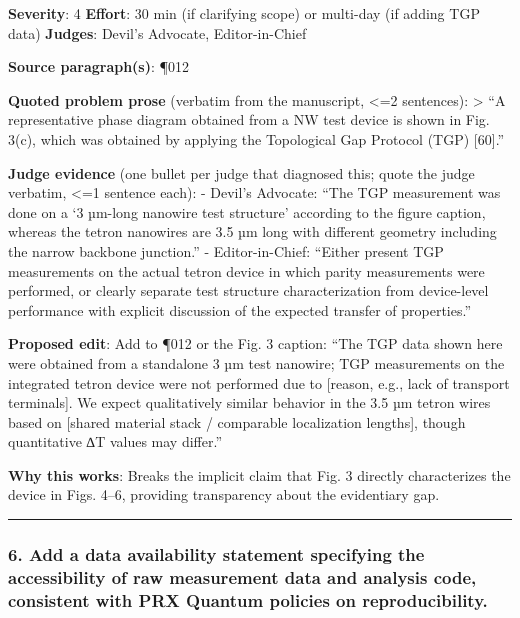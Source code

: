 \documentclass[10pt,letterpaper]{article}
\begin{document}
\textbf{Severity}: 4 \textbf{Effort}: 30 min (if clarifying scope) or multi-day (if adding TGP data) \textbf{Judges}: Devil's Advocate, Editor-in-Chief

\textbf{Source paragraph(s)}: ¶012

\textbf{Quoted problem prose} (verbatim from the manuscript, \textless=2 sentences):
\textgreater{} ``A representative phase diagram obtained from a NW test device is shown in Fig. 3(c), which was obtained by applying the Topological Gap Protocol (TGP) {[}60{]}.''

\textbf{Judge evidence} (one bullet per judge that diagnosed this; quote the judge verbatim, \textless=1 sentence each):
- Devil's Advocate: ``The TGP measurement was done on a `3 µm-long nanowire test structure' according to the figure caption, whereas the tetron nanowires are 3.5 µm long with different geometry including the narrow backbone junction.''
- Editor-in-Chief: ``Either present TGP measurements on the actual tetron device in which parity measurements were performed, or clearly separate test structure characterization from device-level performance with explicit discussion of the expected transfer of properties.''

\textbf{Proposed edit}: Add to ¶012 or the Fig. 3 caption: ``The TGP data shown here were obtained from a standalone 3 µm test nanowire; TGP measurements on the integrated tetron device were not performed due to {[}reason, e.g., lack of transport terminals{]}. We expect qualitatively similar behavior in the 3.5 µm tetron wires based on {[}shared material stack / comparable localization lengths{]}, though quantitative ∆T values may differ.''

\textbf{Why this works}: Breaks the implicit claim that Fig. 3 directly characterizes the device in Figs. 4--6, providing transparency about the evidentiary gap.

\begin{center}\rule{0.5\linewidth}{0.5pt}\end{center}

\hypertarget{add-a-data-availability-statement-specifying-the-accessibility-of-raw-measurement-data-and-analysis-code-consistent-with-prx-quantum-policies-on-reproducibility.}{%
\subsubsection{6. Add a data availability statement specifying the accessibility of raw measurement data and analysis code, consistent with PRX Quantum policies on reproducibility.}\label{add-a-data-availability-statement-specifying-the-accessibility-of-raw-measurement-data-and-analysis-code-consistent-with-prx-quantum-policies-on-reproducibility.}}
\end{document}
